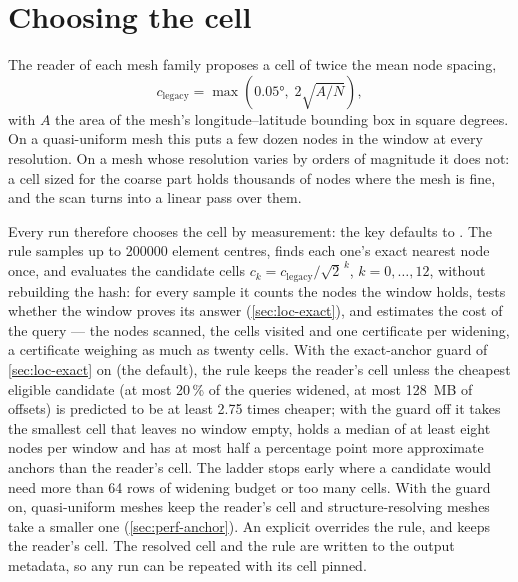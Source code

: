 \section{Choosing the cell}\label{sec:loc-cell}

The reader of each mesh family proposes a cell of twice the mean node spacing,
\begin{equation}\label{eq:loc-legacy}
  c_{\text{legacy}}=\max\!\left(\ang{0.05},\;2\sqrt{A/N}\right),
\end{equation}
with $A$ the area of the mesh's longitude--latitude bounding box in square degrees. On a
quasi-uniform mesh this puts a few dozen nodes in the window at every resolution. On a mesh whose
resolution varies by orders of magnitude it does not: a cell sized for the coarse part holds
thousands of nodes where the mesh is fine, and the scan turns into a linear pass over them.

Every run therefore chooses the cell by measurement: the key
 defaults to . The rule samples up to \num{200000} element centres, finds each one's exact
nearest node once, and evaluates the candidate cells $c_k=c_{\text{legacy}}/\sqrt{2}^{\,k}$,
$k=0,\dots,12$, without rebuilding the hash: for every sample it counts the nodes the window holds,
tests whether the window proves its answer (\cref{sec:loc-exact}), and estimates the cost of the query
--- the nodes scanned, the cells visited and one certificate per widening, a certificate weighing as
much as twenty cells. With the exact-anchor guard of \cref{sec:loc-exact} on (the default), the rule keeps
the reader's cell unless the cheapest eligible candidate (at most 20\,\% of the queries widened, at most
\SI{128}{MB} of offsets) is predicted to be at least 2.75 times cheaper; with the guard off it takes the
smallest cell that leaves no window empty, holds a median of at least eight nodes per window and has at
most half a percentage point more approximate anchors than the reader's cell. The ladder stops early where a candidate would need more than 64 rows of widening
budget or too many cells. With the guard on, quasi-uniform meshes keep the reader's cell and structure-resolving
meshes take a smaller one
(\cref{sec:perf-anchor}). An explicit  overrides the rule, and
 keeps the reader's cell. The resolved cell and the rule are
written to the output metadata, so any run can be repeated with its cell pinned.


